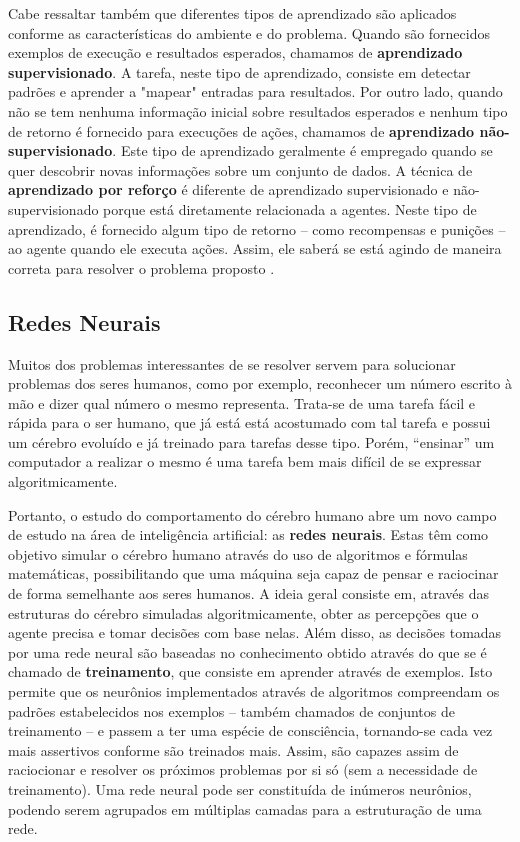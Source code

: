 Cabe ressaltar também que diferentes tipos de aprendizado são aplicados
conforme as características do ambiente e do problema. Quando são fornecidos
exemplos de execução e resultados esperados, chamamos de \textbf{aprendizado
supervisionado}. A tarefa, neste tipo de aprendizado, consiste em detectar
padrões e aprender a "mapear" entradas para resultados. Por outro lado, quando
não se tem nenhuma informação inicial sobre resultados esperados e nenhum tipo
de retorno é fornecido para execuções de ações, chamamos de \textbf{aprendizado
não-supervisionado}. Este tipo de aprendizado geralmente é empregado quando se
quer descobrir novas informações sobre um conjunto de dados. A técnica de
\textbf{aprendizado por reforço} é diferente de aprendizado supervisionado e
não-supervisionado porque está diretamente relacionada a agentes. Neste tipo de
aprendizado, é fornecido algum tipo de retorno -- como recompensas e punições
-- ao agente quando ele executa ações.  Assim, ele saberá se está agindo de
maneira correta para resolver o problema proposto
\cite{Russell:1995:AIM:193191}.

\subsection{Redes Neurais}

Muitos dos problemas interessantes de se resolver servem para solucionar
problemas dos seres humanos, como por exemplo, reconhecer um número escrito à
mão e dizer qual número o mesmo representa. Trata-se de uma tarefa fácil e
rápida para o ser humano, que já está está acostumado com tal tarefa e possui
um cérebro evoluído e já treinado para tarefas desse tipo. Porém, ``ensinar'' um
computador a realizar o mesmo é uma tarefa bem mais difícil de se expressar
algoritmicamente.

Portanto, o estudo do comportamento do cérebro humano abre um novo campo de
estudo na área de inteligência artificial: as \textbf{redes neurais}. Estas têm
como objetivo simular o cérebro humano através do uso de algoritmos e fórmulas
matemáticas, possibilitando que uma máquina seja capaz de pensar e raciocinar de
forma semelhante aos seres humanos. A ideia geral consiste em, através das
estruturas do cérebro simuladas algoritmicamente, obter as percepções que o
agente precisa e tomar decisões com base nelas. Além disso, as decisões tomadas
por uma rede neural são baseadas no conhecimento obtido através do que se é
chamado de \textbf{treinamento}, que consiste em aprender através de exemplos.
Isto permite que os neurônios implementados através de algoritmos compreendam os
padrões estabelecidos nos exemplos -- também chamados de conjuntos de
treinamento -- e passem a ter uma espécie de consciência, tornando-se cada vez
mais assertivos conforme são treinados mais. Assim, são capazes assim de
raciocionar e resolver os próximos problemas por si só (sem a necessidade de
treinamento). Uma rede neural pode ser constituída de inúmeros neurônios,
podendo serem agrupados em múltiplas camadas para a estruturação de uma rede.

